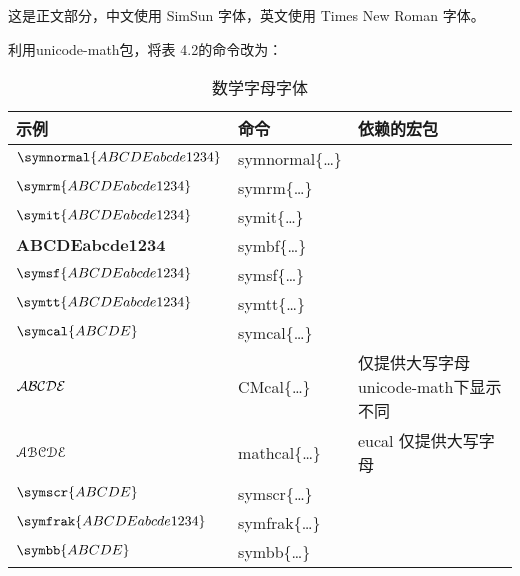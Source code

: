 \documentclass{article}
\begin{document}
这是正文部分，中文使用 SimSun 字体，英文使用 Times New Roman 字体。

利用unicode-math包，将表 4.2的命令改为：
\begin{table}[htp]
  \centering
  \caption{数学字母字体} \label{tbl:math-fonts}
  \begin{tabular}{*{3}{l}}
  \hline
  \textbf{示例}    & \textbf{命令} & \textbf{依赖的宏包}\\
  \hline
  $\symnormal{ABCDE abcde 1234}$  & {symnormal}\{\ldots\}&       \\
  $\symrm{ABCDE abcde 1234}$      & {symrm}\{\ldots\}    &       \\
  $\symit{ABCDE abcde 1234}$      & {symit}\{\ldots\}    &       \\
  $\symbf{ABCDE abcde 1234}$      & {symbf}\{\ldots\}    &       \\
  $\symsf{ABCDE abcde 1234}$      & {symsf}\{\ldots\}    &       \\
  $\symtt{ABCDE abcde 1234}$      & {symtt}\{\ldots\}    &       \\
  $\symcal{ABCDE}$                  & {symcal}\{\ldots\}   &   \\
  $\CMcal{ABCDE}$                  & {CMcal}\{\ldots\}   & 仅提供大写字母unicode-math下显示不同 \\
 \hline
  $\EuScript{ABCDE}$               & {mathcal}\{\ldots\}   & {eucal} 仅提供大写字母 \\
  $\symscr{ABCDE}$                & {symscr}\{\ldots\}   & \\
  $\symfrak{ABCDE abcde 1234}$    & {symfrak}\{\ldots\}  &   \\
  $\symbb{ABCDE}$                 & {symbb}\{\ldots\}    &    \\
  \hline
  \end{tabular}
\end{table}
\end{document}

